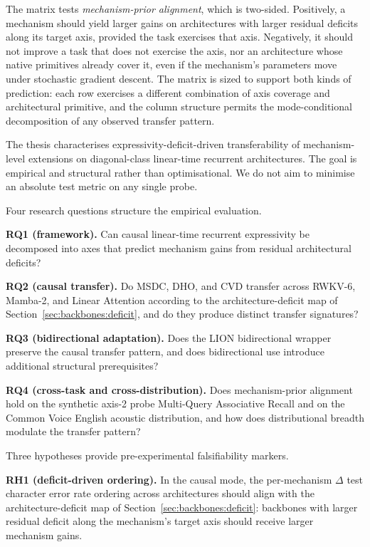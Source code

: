 The matrix tests \textit{mechanism-prior alignment}, which is
two-sided. Positively, a mechanism should yield larger gains on
architectures with larger residual deficits along its target axis,
provided the task exercises that axis. Negatively, it should not
improve a task that does not exercise the axis, nor an
architecture whose native primitives already cover it, even if the
mechanism's parameters move under stochastic gradient descent. The
matrix is sized to support both kinds of prediction: each row
exercises a different combination of axis coverage and
architectural primitive, and the column structure permits the
mode-conditional decomposition of any observed transfer pattern.

The thesis characterises expressivity-deficit-driven transferability
of mechanism-level extensions on diagonal-class linear-time
recurrent architectures. The goal is empirical and structural rather
than optimisational. We do not aim to minimise an absolute test
metric on any single probe.

Four research questions structure the empirical evaluation.

\textbf{RQ1 (framework).} Can causal linear-time recurrent
expressivity be decomposed into axes that predict mechanism gains
from residual architectural deficits?

\textbf{RQ2 (causal transfer).} Do MSDC, DHO, and CVD transfer
across RWKV-6, Mamba-2, and Linear Attention according to the
architecture-deficit map of
Section~\ref{sec:backbones:deficit}, and do they produce distinct
transfer signatures?

\textbf{RQ3 (bidirectional adaptation).} Does the LION
bidirectional wrapper preserve the causal transfer pattern, and
does bidirectional use introduce additional structural
prerequisites?

\textbf{RQ4 (cross-task and cross-distribution).} Does
mechanism-prior alignment hold on the synthetic axis-2 probe
Multi-Query Associative Recall and on the Common Voice English
acoustic distribution, and how does distributional breadth
modulate the transfer pattern?

Three hypotheses provide pre-experimental falsifiability markers.

\textbf{RH1 (deficit-driven ordering).} In the causal mode, the
per-mechanism $\Delta$ test character error rate ordering across
architectures should align with the architecture-deficit map of
Section~\ref{sec:backbones:deficit}: backbones with larger
residual deficit along the mechanism's target axis should receive
larger mechanism gains.

